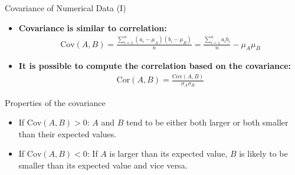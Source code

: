 \begin{frame}{Covariance of Numerical Data (I)}
	\begin{itemize}
		\item \textbf{\color{airforceblue}Covariance} \textbf{is similar to
			      correlation:}
		      \begin{align*}
			      \text{Cov}(A, B) =
			      \frac{\sum_{i=1}^{n}(a_i-\mu_{A})(b_i-\mu_{B})}{n} =
			      \frac{\sum_{i=1}^{n}a_ib_i}{n}-\mu_{A}\mu_{B}
		      \end{align*}
		\item \textbf{It is possible to compute the correlation based on the
			      covariance:}
		      \begin{align*}
			      \text{Cor}(A, B) = \frac{\text{Cov}(A,
				      B)}{\sigma_{A}\sigma_{B}}
		      \end{align*}
	\end{itemize}
	\begin{block}{Properties of the covariance}
		\begin{itemize}
			\item If $\text{Cov}(A, B) > 0$: $A$ and $B$ tend to be either both
			      larger or both smaller than their expected values.
			\item If $\text{Cov}(A, B) < 0$: If $A$ is larger than its expected
			      value, $B$ is likely to be smaller than its expected value and vice
			      versa.
		\end{itemize}
	\end{block}
\end{frame}

